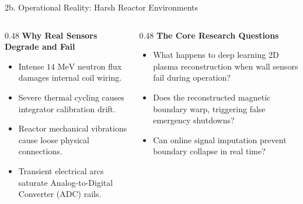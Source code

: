 \documentclass[aspectratio=169, 10pt]{beamer}
\begin{document}
\begin{frame}{2b. Operational Reality: Harsh Reactor Environments}
  \begin{columns}[T]
    \begin{column}{0.48\textwidth}
      \textbf{\color{NavyBlue} Why Real Sensors Degrade and Fail}
      \begin{itemize}
        \item Intense $14\text{ MeV}$ neutron flux damages internal coil wiring.
        \item Severe thermal cycling causes integrator calibration drift.
        \item Reactor mechanical vibrations cause loose physical connections.
        \item Transient electrical arcs saturate Analog-to-Digital Converter (ADC) rails.
      \end{itemize}
    \end{column}

    \begin{column}{0.48\textwidth}
      \textbf{\color{NavyBlue} The Core Research Questions}
      \begin{itemize}
        \item What happens to deep learning 2D plasma reconstruction when wall sensors fail during operation?
        \item Does the reconstructed magnetic boundary warp, triggering false emergency shutdowns?
        \item Can online signal imputation prevent boundary collapse in real time?
      \end{itemize}
    \end{column}
  \end{columns}
\end{frame}
\end{document}
